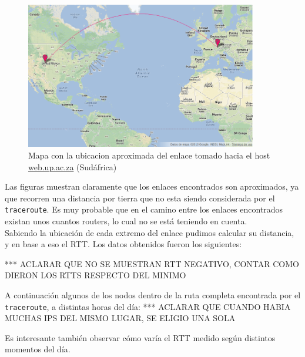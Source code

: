 \begin{figure}[H]
  \centering
    \includegraphics[width=0.9\textwidth]{imgs/sudafrica_enlace_1.png}
    \caption{Mapa con la ubicacion aproximada del enlace tomado hacia el host \url{web.up.ac.za} (Sud\'africa)}
    \label{fig:mapa_sud}
\end{figure}

Las figuras muestran claramente que los enlaces encontrados son aproximados, ya que recorren una distancia por tierra que no esta siendo considerada por el \texttt{traceroute}. Es muy probable que en el camino entre los enlaces encontrados existan unos cuantos routers, lo cual no se est\'a teniendo en cuenta.\\

Sabiendo la ubicaci\'on de cada extremo del enlace pudimos calcular su distancia, y en base a eso el RTT. Los datos obtenidos fueron los siguientes:


*** ACLARAR QUE NO SE MUESTRAN RTT NEGATIVO, CONTAR COMO DIERON LOS RTTS RESPECTO DEL MINIMO

A continuaci\'on algunos de los nodos dentro de la ruta completa encontrada por el \texttt{traceroute}, a distintas horas del d\'ia:
*** ACLARAR QUE CUANDO HABIA MUCHAS IPS DEL MISMO LUGAR, SE ELIGIO UNA SOLA


Es interesante tambi\'en observar c\'omo var\'ia el RTT medido seg\'un distintos momentos del d\'ia.

